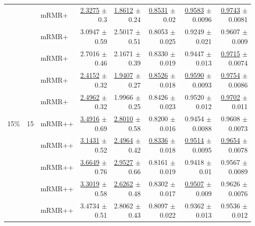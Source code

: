 \begin{longtable}{llp{}rrrrr}
 &  & mRMR+ & \underline{2.3275} {\scriptsize $\pm$ 0.3} & \underline{1.8612} {\scriptsize $\pm$ 0.24} & \underline{0.8531} {\scriptsize $\pm$ 0.02} & \underline{0.9583} {\scriptsize $\pm$ 0.0096} & \underline{0.9743} {\scriptsize $\pm$ 0.0081} \\
 &  & mRMR+ & 3.0947 {\scriptsize $\pm$ 0.59} & 2.5017 {\scriptsize $\pm$ 0.51} & 0.8053 {\scriptsize $\pm$ 0.025} & 0.9249 {\scriptsize $\pm$ 0.021} & 0.9607 {\scriptsize $\pm$ 0.009} \\
 &  & mRMR+ & 2.7016 {\scriptsize $\pm$ 0.46} & 2.1671 {\scriptsize $\pm$ 0.39} & 0.8330 {\scriptsize $\pm$ 0.019} & 0.9447 {\scriptsize $\pm$ 0.013} & \underline{0.9715} {\scriptsize $\pm$ 0.0074} \\
 &  & mRMR+ & \underline{2.4152} {\scriptsize $\pm$ 0.32} & \underline{1.9407} {\scriptsize $\pm$ 0.27} & \underline{0.8526} {\scriptsize $\pm$ 0.018} & \underline{0.9590} {\scriptsize $\pm$ 0.0093} & \underline{0.9754} {\scriptsize $\pm$ 0.0086} \\
 &  & mRMR+ & \underline{2.4962} {\scriptsize $\pm$ 0.32} & 1.9966 {\scriptsize $\pm$ 0.25} & 0.8426 {\scriptsize $\pm$ 0.023} & 0.9520 {\scriptsize $\pm$ 0.012} & \underline{0.9702} {\scriptsize $\pm$ 0.011} \\
\midrule
15\% & 15 & mRMR++ & \underline{3.4916} {\scriptsize $\pm$ 0.69} & \underline{2.8010} {\scriptsize $\pm$ 0.58} & 0.8200 {\scriptsize $\pm$ 0.016} & 0.9454 {\scriptsize $\pm$ 0.0088} & 0.9608 {\scriptsize $\pm$ 0.0073} \\
 &  & mRMR++ & \underline{3.1431} {\scriptsize $\pm$ 0.52} & \underline{2.4964} {\scriptsize $\pm$ 0.42} & \underline{0.8336} {\scriptsize $\pm$ 0.018} & \underline{0.9514} {\scriptsize $\pm$ 0.0095} & \underline{0.9654} {\scriptsize $\pm$ 0.0078} \\
 &  & mRMR++ & \underline{3.6649} {\scriptsize $\pm$ 0.76} & \underline{2.9527} {\scriptsize $\pm$ 0.66} & 0.8161 {\scriptsize $\pm$ 0.019} & 0.9418 {\scriptsize $\pm$ 0.01} & 0.9567 {\scriptsize $\pm$ 0.0089} \\
 &  & mRMR++ & \underline{3.3019} {\scriptsize $\pm$ 0.58} & \underline{2.6262} {\scriptsize $\pm$ 0.48} & 0.8302 {\scriptsize $\pm$ 0.017} & \underline{0.9507} {\scriptsize $\pm$ 0.009} & 0.9626 {\scriptsize $\pm$ 0.0076} \\
 &  & mRMR++ & 3.4734 {\scriptsize $\pm$ 0.51} & 2.8062 {\scriptsize $\pm$ 0.43} & 0.8097 {\scriptsize $\pm$ 0.022} & 0.9362 {\scriptsize $\pm$ 0.013} & 0.9536 {\scriptsize $\pm$ 0.012} \\

\end{longtable}
